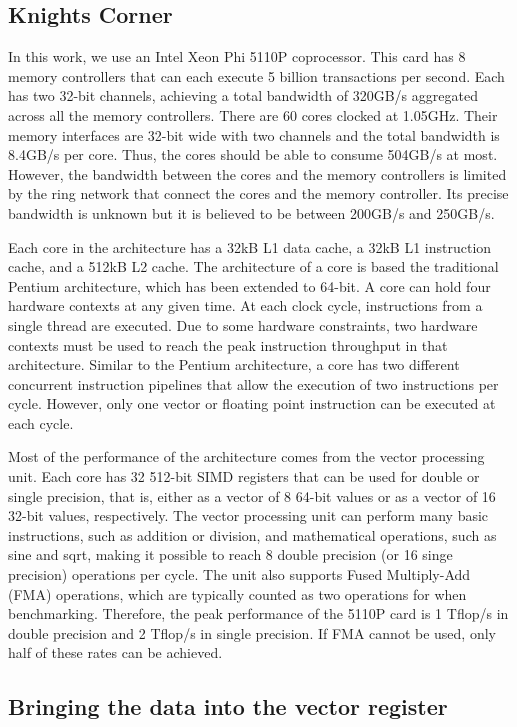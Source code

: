 \documentclass[10pt,conference,compsocconf]{IEEEtran}
\begin{document}
\subsection{Knights Corner}

In this work, we use an Intel Xeon Phi 5110P coprocessor. This card
has 8 memory controllers that can each execute 5 billion
transactions per second. Each has two 32-bit channels, achieving a total
bandwidth of 320GB/s aggregated across all the memory
controllers. There are 60 cores clocked at 1.05GHz. Their memory
interfaces are 32-bit wide with two channels and the total bandwidth
is 8.4GB/s per core. Thus, the cores should be able to consume 504GB/s
at most. However, the bandwidth between the cores and the memory
controllers is limited by the ring network that connect the cores and
the memory controller. Its precise bandwidth is unknown but it is
believed to be between 200GB/s and 250GB/s.

Each core in the architecture has a 32kB L1 data cache, a 32kB L1
instruction cache, and a 512kB L2 cache. The architecture of a core is
based the traditional Pentium architecture, which has been extended to
64-bit. A core can hold four hardware contexts at any given time. At each
clock cycle, instructions from a single thread are executed. Due to
some hardware constraints, two hardware contexts must be used to reach
the peak instruction throughput in that architecture. Similar to the
Pentium architecture, a core has two different concurrent instruction
pipelines that allow the execution of two instructions per
cycle. However, only one vector or floating point instruction can be
executed at each cycle.

Most of the performance of the architecture comes from the vector
processing unit. Each core has 32 512-bit SIMD registers that can be
used for double or single precision, that is, either as a vector of 8
64-bit values or as a vector of 16 32-bit values, respectively. The
vector processing unit can perform many basic instructions, such as
addition or division, and mathematical operations, such as sine and
sqrt, making it possible to reach 8 double precision (or 16 singe precision)
operations per cycle.  
The unit also supports Fused Multiply-Add (FMA)
operations, which are typically counted as two operations for
when benchmarking. Therefore, the peak performance of the 5110P
card is 1 Tflop/s in double precision and 2 Tflop/s in single
precision. If FMA cannot be used, only half of these rates can be
achieved.


\subsection{Bringing the data into the vector register}
\end{document}
